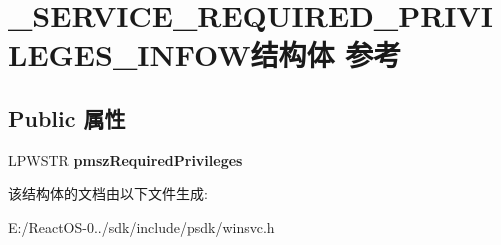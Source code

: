 \hypertarget{struct___s_e_r_v_i_c_e___r_e_q_u_i_r_e_d___p_r_i_v_i_l_e_g_e_s___i_n_f_o_w}{}\section{\+\_\+\+S\+E\+R\+V\+I\+C\+E\+\_\+\+R\+E\+Q\+U\+I\+R\+E\+D\+\_\+\+P\+R\+I\+V\+I\+L\+E\+G\+E\+S\+\_\+\+I\+N\+F\+O\+W结构体 参考}
\label{struct___s_e_r_v_i_c_e___r_e_q_u_i_r_e_d___p_r_i_v_i_l_e_g_e_s___i_n_f_o_w}
\subsection*{Public 属性}
\begin{DoxyCompactItemize}
\item 
\mbox{\label{struct___s_e_r_v_i_c_e___r_e_q_u_i_r_e_d___p_r_i_v_i_l_e_g_e_s___i_n_f_o_w_aedb9c41fca6192a628330b3d23ac6431}} 
L\+P\+W\+S\+TR {\bfseries pmsz\+Required\+Privileges}
\end{DoxyCompactItemize}


该结构体的文档由以下文件生成\+:\begin{DoxyCompactItemize}
\item 
E\+:/\+React\+O\+S-\/0../sdk/include/psdk/winsvc.\+h\end{DoxyCompactItemize}
